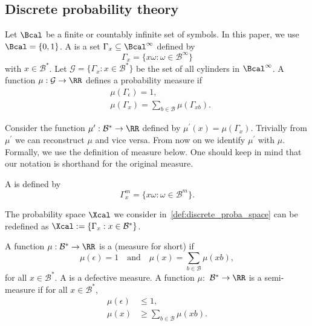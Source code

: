 \subsection{Discrete probability theory}\label{sec:Discrete_proba}
\begin{definition}\label{def:cylinder}\citep{li2019introduction}
    Let $\Bcal$ be a finite or countably infinite set of symbols. In this paper, we use $\Bcal=\{0,1\}$. A  is a set $\Gamma_x\subseteq \Bcal^\infty$ defined by
    \begin{equation}
        \Gamma_x=\{x\omega:\omega\in\mathcal{B}^\infty\}
    \end{equation}
    with $x\in\mathcal{B}^*$. Let $\mathcal{G}=\{\Gamma_x:x\in\mathcal{B}^*\}$ be the set of all cylinders in $\Bcal^\infty$.
A function $\mu:\mathcal{G}\to\RR$ defines a probability measure if
$$\begin{aligned}&\mu(\Gamma_\epsilon)=1,\\&\mu(\Gamma_x)=\sum_{b\in\mathcal{B}}\mu(\Gamma_{xb}).\end{aligned}$$
\end{definition}
Consider the function $\mu^{\prime}:\mathcal{B}^*\to\RR$ defined by $\mu^{\prime}(x)=\mu(\Gamma_x)$. Trivially from $\mu^\prime$ we can reconstruct $\mu$ and vice versa. From now on we identify $\mu^{\prime}$ with $\mu.$ Formally, we use the definition of measure below. One should keep in mind that our notation is shorthand for the original measure. 

\begin{definition}
    A  is defined by
    \begin{equation}
        \Gamma_x^m=\{x\omega:\omega\in\mathcal{B}^m\}.
    \end{equation}
\end{definition}
The probability space $\Xcal$ we consider in~\cref{def:discrete_proba_space} can be redefined as $\Xcal:=\{\Gamma_x:x\in\mathcal{B}^*\}$.

\begin{definition}\citep{li2019introduction}
    A function $\mu:\mathcal{B}^*\to\RR$ is a  (measure for short) if
\begin{equation}
    \mu(\epsilon)=1 \quad \text{and} \quad \mu(x)=\sum_{b\in\mathcal{B}}\mu(xb),
\end{equation}
for all $x\in\mathcal{B}^*.$ A  is a defective measure. A function $\mu:$
$\mathcal{B}^*\to\RR$ is a semi-measure if for all $x\in\mathcal{B}^*$,
$$\begin{aligned}\mu(\epsilon)&\leq1,\\\mu(x)&\geq\sum_{b\in\mathcal{B}}\mu(xb).\end{aligned}$$
\end{definition}

